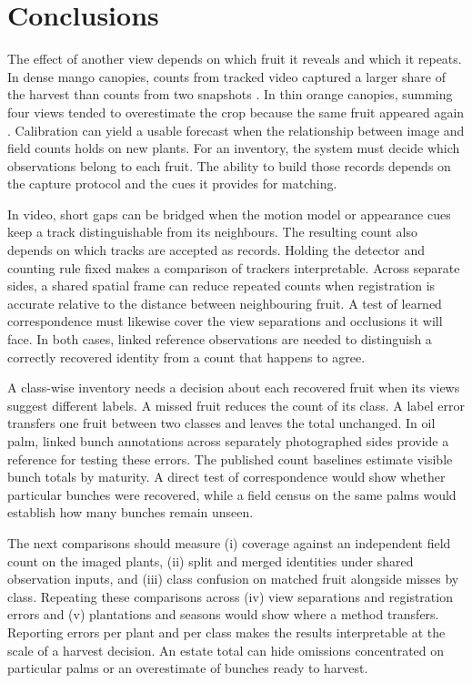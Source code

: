 \section{Conclusions}\label{sec:conclusion}

The effect of another view depends on which fruit it reveals and which it repeats. In dense mango canopies, counts from tracked video captured a larger share of the harvest than counts from two snapshots \citep{wang2019mango}. In thin orange canopies, summing four views tended to overestimate the crop because the same fruit appeared again \citep{mirhaji2021fruit}. Calibration can yield a usable forecast when the relationship between image and field counts holds on new plants. For an inventory, the system must decide which observations belong to each fruit. The ability to build those records depends on the capture protocol and the cues it provides for matching.

In video, short gaps can be bridged when the motion model or appearance cues keep a track distinguishable from its neighbours. The resulting count also depends on which tracks are accepted as records. Holding the detector and counting rule fixed makes a comparison of trackers interpretable. Across separate sides, a shared spatial frame can reduce repeated counts when registration is accurate relative to the distance between neighbouring fruit. A test of learned correspondence must likewise cover the view separations and occlusions it will face. In both cases, linked reference observations are needed to distinguish a correctly recovered identity from a count that happens to agree.

A class-wise inventory needs a decision about each recovered fruit when its views suggest different labels. A missed fruit reduces the count of its class. A label error transfers one fruit between two classes and leaves the total unchanged. In oil palm, linked bunch annotations across separately photographed sides provide a reference for testing these errors. The published count baselines estimate visible bunch totals by maturity. A direct test of correspondence would show whether particular bunches were recovered, while a field census on the same palms would establish how many bunches remain unseen.

The next comparisons should measure (i) coverage against an independent field count on the imaged plants, (ii) split and merged identities under shared observation inputs, and (iii) class confusion on matched fruit alongside misses by class. Repeating these comparisons across (iv) view separations and registration errors and (v) plantations and seasons would show where a method transfers. Reporting errors per plant and per class makes the results interpretable at the scale of a harvest decision. An estate total can hide omissions concentrated on particular palms or an overestimate of bunches ready to harvest.

